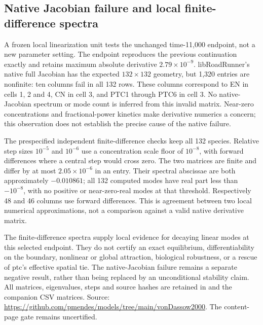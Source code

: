\subsection{Native Jacobian failure and local finite-difference spectra}
A frozen local linearization unit tests the unchanged time-11,000 endpoint, not a new parameter setting. The endpoint reproduces the previous continuation exactly and retains maximum absolute derivative $2.79\times10^{-9}$. libRoadRunner's native full Jacobian has the expected $132\times132$ geometry, but 1,320 entries are nonfinite: ten columns fail in all 132 rows. These columns correspond to EN in cells 1, 2 and 4, CN in cell 3, and PTC1 through PTC6 in cell 3. No native-Jacobian spectrum or mode count is inferred from this invalid matrix. Near-zero concentrations and fractional-power kinetics make derivative numerics a concern; this observation does not establish the precise cause of the native failure.

The prespecified independent finite-difference checks keep all 132 species. Relative step sizes $10^{-5}$ and $10^{-6}$ use a concentration scale floor of $10^{-8}$, with forward differences where a central step would cross zero. The two matrices are finite and differ by at most $2.05\times10^{-6}$ in an entry. Their spectral abscissae are both approximately $-0.010861$; all 132 computed modes have real part less than $-10^{-8}$, with no positive or near-zero-real modes at that threshold. Respectively 48 and 46 columns use forward differences. This is agreement between two local numerical approximations, not a comparison against a valid native derivative matrix.

The finite-difference spectra supply local evidence for decaying linear modes at this selected endpoint. They do not certify an exact equilibrium, differentiability on the boundary, nonlinear or global attraction, biological robustness, or a rescue of ptc's effective spatial tie. The native-Jacobian failure remains a separate negative result, rather than being replaced by an unconditional stability claim. All matrices, eigenvalues, steps and source hashes are retained in  and the companion CSV matrices. Source: \url{https://github.com/pmendes/models/tree/main/vonDassow2000}. The content-page gate remains uncertified.
